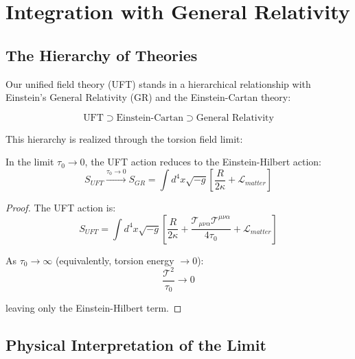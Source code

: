 \section{Integration with General Relativity}
\label{sec:gr_integration}

\subsection{The Hierarchy of Theories}

Our unified field theory (UFT) stands in a hierarchical relationship with Einstein's General Relativity (GR) and the Einstein-Cartan theory:

\begin{equation}
    \text{UFT} \supset \text{Einstein-Cartan} \supset \text{General Relativity}
    \label{eq:theory_hierarchy}
\end{equation}

This hierarchy is realized through the torsion field limit:

\begin{theorem}
In the limit $\tau_0 \to 0$, the UFT action reduces to the Einstein-Hilbert action:
\begin{equation}
    S_{UFT} \xrightarrow{\tau_0 \to 0} S_{GR} = \int d^4x \sqrt{-g} \left[\frac{R}{2\kappa} + \mathcal{L}_{matter}\right]
\end{equation}
\end{theorem}

\begin{proof}
The UFT action is:
\begin{equation}
    S_{UFT} = \int d^4x \sqrt{-g} \left[\frac{R}{2\kappa} + \frac{\mathcal{T}_{\mu\nu\alpha}\mathcal{T}^{\mu\nu\alpha}}{4\tau_0} + \mathcal{L}_{matter}\right]
\end{equation}

As $\tau_0 \to \infty$ (equivalently, torsion energy $\to 0$):
\begin{equation}
    \frac{\mathcal{T}^2}{\tau_0} \to 0
\end{equation}

leaving only the Einstein-Hilbert term.
\end{proof}

\subsection{Physical Interpretation of the Limit}


